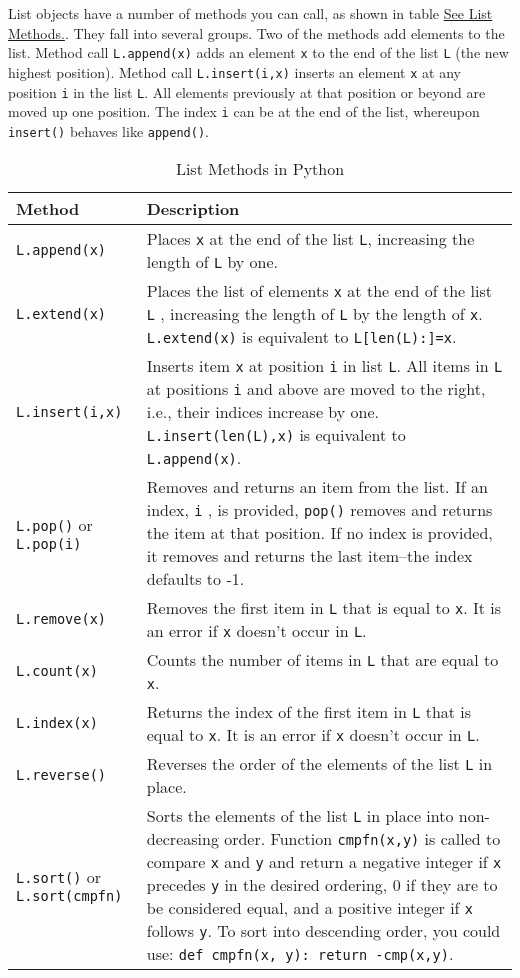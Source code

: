 List objects have a number of
methods you can call, as shown in table \href{chap2.html\#20881}{See List
Methods.}. They fall into several groups. Two of the methods add
elements to the list. Method call \texttt{L.append(x)} adds an element
\texttt{x} to the end of the list \texttt{L} (the new highest position).
Method call \texttt{L.insert(i,x)} inserts an element \texttt{x} at any
position \texttt{i} in the list \texttt{L}. All elements previously at that
position or beyond are moved up one position. The index \texttt{i} can be
at the end of the list, whereupon \texttt{insert()} behaves like
\texttt{append()}.


\begin{longtable}{l|p{7cm}}
\caption{List Methods in Python}
\label{table:list-methods-python}\\
%
\toprule
Method & Description \\
%
\midrule
\verb"L.append(x)" & Places \texttt{x} at the end of the list \texttt{L}, increasing the length of \texttt{L} by one. \\
%
\verb"L.extend(x)" & Places the list of elements \verb"x" at the end of the list \verb"L" , increasing the length of \verb"L" by the length of \verb"x". \verb"L.extend(x)" is equivalent to \verb"L[len(L):]=x". \\
%
\verb"L.insert(i,x)" &  Inserts item \texttt{x} at position \texttt{i} in list \texttt{L}.
All items in \texttt{L} at positions \texttt{i} and above are moved to the right, i.e., their indices increase by one.
\texttt{L.insert(len(L),x)} is equivalent to \texttt{L.append(x)}. \\
%
\verb"L.pop()" or \verb"L.pop(i)" &  Removes and returns an item from the list. If an index, \texttt{i} , is provided, \texttt{pop()} removes and returns the item at that position. If no index is provided, it removes and returns the last item--the index defaults to -1. \\
%
\verb"L.remove(x)" & Removes the first item in \texttt{L} that is equal to \texttt{x}. It is an error if \texttt{x} doesn't occur in \texttt{L}. \\ 
%
\verb"L.count(x)" & Counts the number of items in \texttt{L} that are equal to \texttt{x}. \\
\verb"L.index(x)" & Returns the index of the first item in \texttt{L} that is equal to \texttt{x}. It is an error if \texttt{x} doesn't occur in \texttt{L}. \\
%
\verb"L.reverse()" & Reverses the order of the elements of the list \texttt{L} in place. \\
%
\verb"L.sort()" or \verb"L.sort(cmpfn)" & Sorts the elements of the list  \texttt{L} in place into non- decreasing order. Function \texttt{cmpfn(x,y)} is called to compare \texttt{x} and \texttt{y} and return a negative integer  if \texttt{x} precedes \texttt{y} in the desired ordering, 0 if they are to  be considered equal, and a positive integer if \texttt{x} follows \texttt{y}. To sort into descending order, you could use: \verb"def cmpfn(x, y): return -cmp(x,y)". \\
\bottomrule
\end{longtable}
    


